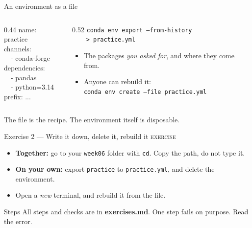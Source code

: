 \documentclass[aspectratio=169,11pt]{beamer}
\newcommand{\code}[1]{\texttt{#1}}
\newcommand{\key}[1]{\textbf{\textcolor{ban}{#1}}}
\newcommand{\exerciseframe}[3]{%
  \begin{frame}[t]{#1}
    \vspace{0.4em}
    {\small\textcolor{softgray}{\textsc{exercise}}}\par\vspace{0.6em}
    #2
    \vfill
    \begin{block}{Steps}
      All steps and checks are in \key{exercises.md}. #3
    \end{block}
    \vspace{0.6em}
  \end{frame}}
\begin{document}
\begin{frame}{An environment as a file}
  \begin{columns}[T]
    \begin{column}{0.44\textwidth}
      \ttfamily\small
      name: practice\\
      channels:\\
      \ \ - conda-forge\\
      dependencies:\\
      \ \ - pandas\\
      \ \ - python=3.14\\
      \textcolor{softgray}{prefix: ...}
    \end{column}
    \begin{column}{0.52\textwidth}
      \code{conda env export --from-history}\\
      \code{\ \ \ \ > practice.yml}
      \vspace{0.6em}
      \begin{itemize}
        \item The packages \emph{you asked for}, and where they come from.
        \item Anyone can rebuild it:\\\code{conda env create --file practice.yml}
      \end{itemize}
    \end{column}
  \end{columns}
  \vspace{1em}
  \centering
  The file is the recipe. The environment itself is disposable.
\end{frame}

\exerciseframe{Exercise 2 --- Write it down, delete it, rebuild it}{%
  \begin{itemize}
    \item \textbf{Together:} go to your \code{week06} folder with \code{cd}. Copy the path, do not type it.
    \item \textbf{On your own:} export \code{practice} to \code{practice.yml}, and delete the environment.
    \item Open a \emph{new} terminal, and rebuild it from the file.
  \end{itemize}}{One step fails on purpose. Read the error.}
\end{document}
